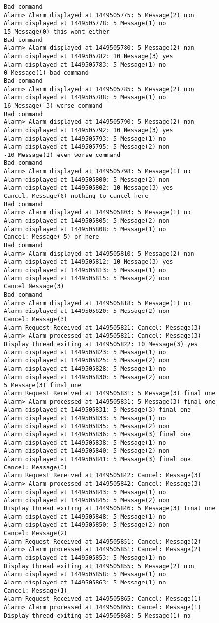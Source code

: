 \documentclass[11pt]{article}
\begin{document}
\begin{Verbatim}[tabsize=8]
Bad command
Alarm> Alarm displayed at 1449505775: 5 Message(2) non
Alarm displayed at 1449505778: 5 Message(1) no
15 Message(0) this wont either
Bad command
Alarm> Alarm displayed at 1449505780: 5 Message(2) non
Alarm displayed at 1449505782: 10 Message(3) yes
Alarm displayed at 1449505783: 5 Message(1) no
0 Message(1) bad command
Bad command
Alarm> Alarm displayed at 1449505785: 5 Message(2) non
Alarm displayed at 1449505788: 5 Message(1) no
16 Message(-3) worse command
Bad command
Alarm> Alarm displayed at 1449505790: 5 Message(2) non
Alarm displayed at 1449505792: 10 Message(3) yes
Alarm displayed at 1449505793: 5 Message(1) no
Alarm displayed at 1449505795: 5 Message(2) non
-10 Message(2) even worse command
Bad command
Alarm> Alarm displayed at 1449505798: 5 Message(1) no
Alarm displayed at 1449505800: 5 Message(2) non
Alarm displayed at 1449505802: 10 Message(3) yes
Cancel: Message(0) nothing to cancel here
Bad command
Alarm> Alarm displayed at 1449505803: 5 Message(1) no
Alarm displayed at 1449505805: 5 Message(2) non
Alarm displayed at 1449505808: 5 Message(1) no
Cancel: Message(-5) or here
Bad command
Alarm> Alarm displayed at 1449505810: 5 Message(2) non
Alarm displayed at 1449505812: 10 Message(3) yes
Alarm displayed at 1449505813: 5 Message(1) no
Alarm displayed at 1449505815: 5 Message(2) non
Cancel Message(3)
Bad command
Alarm> Alarm displayed at 1449505818: 5 Message(1) no
Alarm displayed at 1449505820: 5 Message(2) non
Cancel: Message(3)
Alarm Request Received at 1449505821: Cancel: Message(3)
Alarm> Alarm processed at 1449505821: Cancel: Message(3)
Display thread exiting at 1449505822: 10 Message(3) yes
Alarm displayed at 1449505823: 5 Message(1) no
Alarm displayed at 1449505825: 5 Message(2) non
Alarm displayed at 1449505828: 5 Message(1) no
Alarm displayed at 1449505830: 5 Message(2) non
5 Message(3) final one
Alarm Request Received at 1449505831: 5 Message(3) final one
Alarm> Alarm processed at 1449505831: 5 Message(3) final one
Alarm displayed at 1449505831: 5 Message(3) final one
Alarm displayed at 1449505833: 5 Message(1) no
Alarm displayed at 1449505835: 5 Message(2) non
Alarm displayed at 1449505836: 5 Message(3) final one
Alarm displayed at 1449505838: 5 Message(1) no
Alarm displayed at 1449505840: 5 Message(2) non
Alarm displayed at 1449505841: 5 Message(3) final one
Cancel: Message(3)
Alarm Request Received at 1449505842: Cancel: Message(3)
Alarm> Alarm processed at 1449505842: Cancel: Message(3)
Alarm displayed at 1449505843: 5 Message(1) no
Alarm displayed at 1449505845: 5 Message(2) non
Display thread exiting at 1449505846: 5 Message(3) final one
Alarm displayed at 1449505848: 5 Message(1) no
Alarm displayed at 1449505850: 5 Message(2) non
Cancel: Message(2)
Alarm Request Received at 1449505851: Cancel: Message(2)
Alarm> Alarm processed at 1449505851: Cancel: Message(2)
Alarm displayed at 1449505853: 5 Message(1) no
Display thread exiting at 1449505855: 5 Message(2) non
Alarm displayed at 1449505858: 5 Message(1) no
Alarm displayed at 1449505863: 5 Message(1) no
Cancel: Message(1)
Alarm Request Received at 1449505865: Cancel: Message(1)
Alarm> Alarm processed at 1449505865: Cancel: Message(1)
Display thread exiting at 1449505868: 5 Message(1) no
\end{Verbatim}
\end{document}
